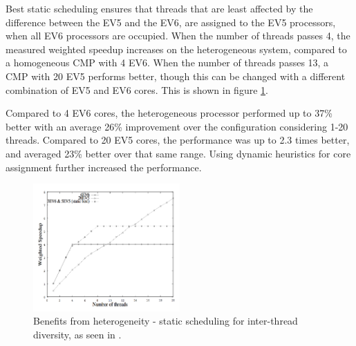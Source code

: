 
Best static scheduling ensures that threads that are least affected by the difference between the EV5 and the EV6, are assigned to the EV5 processors, when all EV6 processors are occupied.
When the number of threads passes 4, the measured weighted speedup increases on the heterogeneous system, compared to a homogeneous CMP with 4 EV6.
When the number of threads passes 13, a CMP with 20 EV5 performs better, though this can be changed with a different combination of EV5 and EV6 cores.
This is shown in figure \ref{fig:Kumar2}.

Compared to 4 EV6 cores, the heterogeneous processor performed up to 37\% better with an average 26\% improvement over the configuration considering 1-20 threads. 
Compared to 20 EV5 cores, the performance was up to 2.3 times better, and averaged 23\% better over that same range. \cite{heterogeneous-perf}
Using dynamic heuristics for core assignment further increased the performance.

\begin{figure}[htb]
    \centering
    \includegraphics[width=0.5\textwidth]{Figures/Heterogeneous/Kumar2}
    \caption{Benefits from heterogeneity - static scheduling for inter-thread diversity, as seen in \cite{heterogeneous-perf}.}
    \label{fig:Kumar2}
\end{figure}

